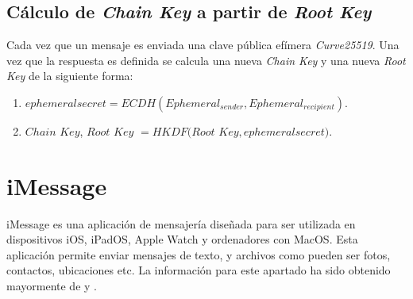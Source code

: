 \subsection{Cálculo de \emph{Chain Key} a partir de \emph{Root Key}}
Cada vez que un mensaje es enviada una clave pública efímera \emph{Curve25519}. Una vez que la respuesta es definida se calcula una nueva \emph{Chain Key} y una nueva \emph{Root Key} de la siguiente forma:
\begin{enumerate}
	\item $ephemeral$\textunderscore $secret = ECDH(Ephemeral_{sender}, Ephemeral_{recipient})$.
	\item $Chain$ $Key$, $Root$ $Key$ $= HKDF(Root$ $Key, ephemeral$\textunderscore$secret)$.
\end{enumerate}

\section{iMessage}
iMessage es una aplicación de mensajería diseñada para ser utilizada en dispositivos iOS, iPadOS, Apple Watch y ordenadores con MacOS. Esta aplicación permite enviar mensajes de texto, y archivos como pueden ser fotos, contactos, ubicaciones etc. La información para este apartado ha sido obtenido mayormente de \cite{apple2} y \cite{apple1}.\\

